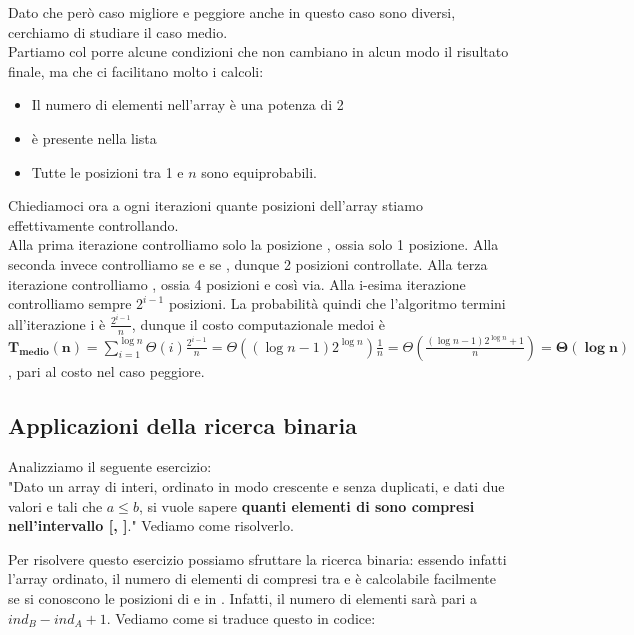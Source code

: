 \documentclass[11pt, a4paper, titlepage, oneside]{scrbook}
\begin{document}
Dato che però caso migliore e peggiore anche in questo caso sono diversi, cerchiamo di studiare il caso medio. \\
Partiamo col porre alcune condizioni che non cambiano in alcun modo il risultato finale, ma che ci facilitano molto i calcoli:
\begin{itemize}
    \item Il numero di elementi nell'array è una potenza di 2
    \item {} è presente nella lista
    \item Tutte le posizioni tra 1 e $n$ sono equiprobabili.
\end{itemize}

Chiediamoci ora a ogni iterazioni quante posizioni dell'array stiamo effettivamente controllando. \\
Alla prima iterazione controlliamo solo la posizione , ossia solo 1 posizione. Alla seconda invece controlliamo  se  e  se , dunque 2 posizioni controllate. Alla terza iterazione controlliamo , ossia 4 posizioni e così via. Alla i-esima iterazione controlliamo sempre $2^{i-1}$ posizioni. La probabilità quindi che l'algoritmo termini all'iterazione i è $\frac{2^{i-1}}{n}$, dunque il costo computazionale medoi è \mbox{$\bm{T_{\textbf{medio}}(n)} = \sum_{i = 1}^{\log n} \Theta(i) \frac{2^{i-1}}{n} = \Theta((\log n - 1) 2^{\log n}) \frac{1}{n} = \Theta(\frac{(\log n - 1) 2^{\log n} + 1}{n}) = \bm{\Theta(\log n)}$}, pari al costo nel caso peggiore. 

\subsection{Applicazioni della ricerca binaria}

Analizziamo il seguente esercizio:\\
"Dato un array  di interi, ordinato in modo crescente e senza duplicati, e dati due valori  e  tali che $a \leq b$, si vuole sapere \textbf{quanti elementi di  sono compresi nell'intervallo [, ]}." Vediamo come risolverlo.

Per risolvere questo esercizio possiamo sfruttare la ricerca binaria: essendo infatti l'array ordinato, il numero di elementi di  compresi tra  e  è calcolabile facilmente se si conoscono le posizioni di  e  in . Infatti, il numero di elementi sarà pari a $ind_B - ind_A + 1$. Vediamo come si traduce questo in codice:
\end{document}
